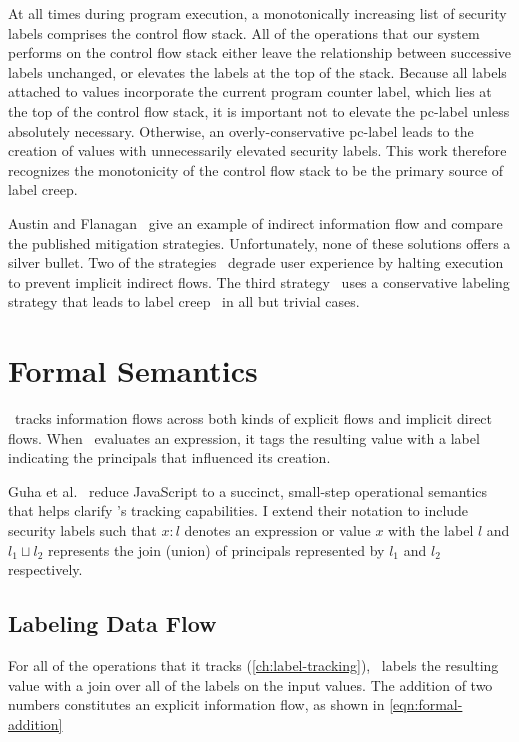 At all times during program execution, a monotonically increasing list of security labels comprises the control flow stack.
All of the operations that our system performs on the control flow stack either leave the relationship between successive labels unchanged, or elevates the labels at the top of the stack.
Because all labels attached to values incorporate the current program counter label, which lies at the top of the control flow stack, it is important not to elevate the pc-label unless absolutely necessary.
Otherwise, an overly-conservative pc-label leads to the creation of values with unnecessarily elevated security labels.
This work therefore recognizes the monotonicity of the control flow stack to be the primary source of label creep.

Austin and Flanagan~\cite{austin.flanagan+12} give an example of indirect information flow and compare the published mitigation strategies.
Unfortunately, none of these solutions offers a silver bullet.
Two of the strategies~\cite{zdancewic+02,austin.flanagan+10} degrade user experience by halting execution to prevent implicit indirect flows.
The third strategy~\cite{vogt.etal+07} uses a conservative labeling strategy that leads to label creep~\cite{sabelfeld.myers+03} in all but trivial cases.

\section{Formal Semantics}

\FlowCore\ tracks information flows across both kinds of explicit flows and implicit direct flows.
When \FlowCore\ evaluates an expression, it tags the resulting value with a label indicating the principals that influenced its creation.

Guha et al.~\cite{guha.etal+10} reduce JavaScript to a succinct, small-step operational semantics that helps clarify \FlowCore's tracking capabilities.
I extend their notation to include security labels such that $x:l$ denotes an expression or value $x$ with the label $l$ and $l_1 \sqcup l_2$ represents the join (union) of principals represented by $l_1$ and $l_2$ respectively.

\subsection{Labeling Data Flow}

For all of the operations that it tracks (\autoref{ch:label-tracking}), \FlowCore\ labels the resulting value with a join over all of the labels on the input values.
The addition of two numbers constitutes an explicit information flow, as shown in \autoref{eqn:formal-addition}


